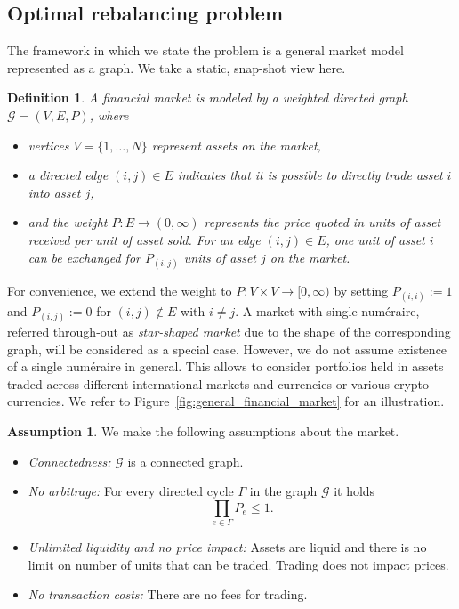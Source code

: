 \documentclass{article}
\newtheorem{definition}[theorem]{Definition}
\theoremstyle{definition}
\newtheorem{assumption}[theorem]{Assumption}
\begin{document}
\subsection{Optimal rebalancing problem} \label{sec:rebalance}
The framework in which we state the problem is a general market model represented as a graph. We take a static, snap-shot view here.
\begin{definition}
A \emph{financial market} is modeled by a weighted directed graph~$\mathcal{G} = (V, E, P)$, where
\begin{itemize}
    \item vertices $V = \{1, \dots, N\}$ represent assets on the market,
    \item a directed edge $(i, j) \in E$ indicates that it is possible to directly trade asset $i$ into asset $j$,
    \item and the weight $P: E \to (0,\infty)$ represents the price quoted in units of asset received per unit of asset sold. For an edge $(i, j) \in E$, one unit of asset $i$ can be exchanged for $P_{(i,j)}$ units of asset $j$ on the market.
\end{itemize}
\end{definition}
For convenience, we extend the weight to $P: V\times V \to [0,\infty)$ by setting $P_{(i,i)} := 1$ and $P_{(i,j)} := 0$ for $(i,j) \not\in E$ with $i \neq j$. A market with single num\'eraire, referred through-out as \emph{star-shaped market} due to the shape of the corresponding graph, will be considered as a special case. However, we do not assume existence of a single num\'eraire in general. This allows to consider portfolios held in assets traded across different international markets and currencies or various crypto currencies. We refer to Figure~\ref{fig:general_financial_market} for an illustration.

\begin{assumption}
We make the following assumptions about the market.
\begin{itemize}
    \item[A1] \textit{Connectedness:}  $\mathcal{G}$ is a connected graph. 
    \item[A2] \textit{No arbitrage:} For every directed cycle $\Gamma$ in the graph $\mathcal{G}$ it holds
    $$\prod_{e \in \Gamma} P_e \leq 1.$$
    \item[A3] \textit{Unlimited liquidity and no price impact:} Assets are liquid and there is no limit on number of units that can be traded. Trading does not impact prices.
    \item[A4] \textit{No transaction costs:} There are no fees for trading.
\end{itemize}
\end{assumption}
\end{document}
